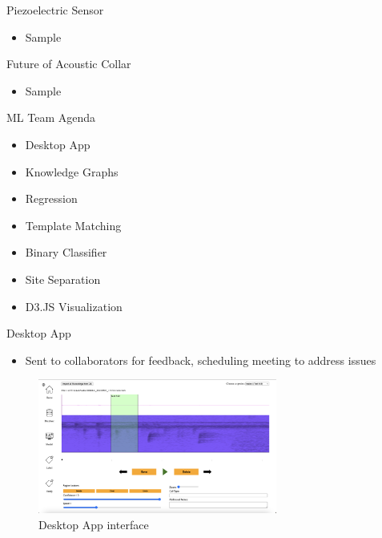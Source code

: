 \begin{frame}{Piezoelectric Sensor}
    \begin{itemize}
        \item Sample
    \end{itemize}
\end{frame}

\begin{frame}{Future of Acoustic Collar}
    \begin{itemize}
        \item Sample
    \end{itemize}
\end{frame}

\begin{frame}{ML Team Agenda}
    \begin{itemize}
        \item Desktop App
        \item Knowledge Graphs
        \item Regression
        \item Template Matching
        \item Binary Classifier
        \item Site Separation
        \item D3.JS Visualization
    \end{itemize}
\end{frame}

\begin{frame}{Desktop App}
    \begin{itemize}
        \item Sent to collaborators for feedback, scheduling meeting to address issues
    \end{itemize}
    \begin{figure}
        \centering
        \includegraphics[height=0.7\textheight,width=0.7\textwidth,keepaspectratio]{images/desktop_app_1.png}
        \caption{Desktop App interface}
    \end{figure}
\end{frame}

